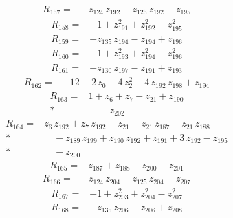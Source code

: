 \documentclass[10pt]{article}
\begin{document}
\begin{align*}
R_{157}={}& - z_{124}\,z_{192} - z_{125}\,z_{192} + z_{195}
\end{align*}
\begin{align*}
R_{158}={}& - 1 + z_{191}^{2} + z_{192}^{2} - z_{195}^{2}
\end{align*}
\begin{align*}
R_{159}={}& - z_{135}\,z_{194} - z_{194} + z_{196}
\end{align*}
\begin{align*}
R_{160}={}& - 1 + z_{193}^{2} + z_{194}^{2} - z_{196}^{2}
\end{align*}
\begin{align*}
R_{161}={}& - z_{130}\,z_{197} - z_{191} + z_{193}
\end{align*}
\begin{align*}
R_{162}={}& - 12 - 2\,z_{0} - 4\,z_{2}^{2} - 4\,z_{192}\,z_{198} + z_{194}
\end{align*}
\begin{align*}
R_{163}={}& 1 + z_{6} + z_{7} - z_{21} + z_{190} \\*
&\quad - z_{202}
\end{align*}
\begin{align*}
R_{164}={}& z_{6}\,z_{192} + z_{7}\,z_{192} - z_{21} - z_{21}\,z_{187} - z_{21}\,z_{188} \\*
&\quad - z_{189}\,z_{199} + z_{190}\,z_{192} + z_{191} + 3\,z_{192} - z_{195} \\*
&\quad - z_{200}
\end{align*}
\begin{align*}
R_{165}={}& z_{187} + z_{188} - z_{200} - z_{201}
\end{align*}
\begin{align*}
R_{166}={}& - z_{124}\,z_{204} - z_{125}\,z_{204} + z_{207}
\end{align*}
\begin{align*}
R_{167}={}& - 1 + z_{203}^{2} + z_{204}^{2} - z_{207}^{2}
\end{align*}
\begin{align*}
R_{168}={}& - z_{135}\,z_{206} - z_{206} + z_{208}
\end{align*}
\end{document}
